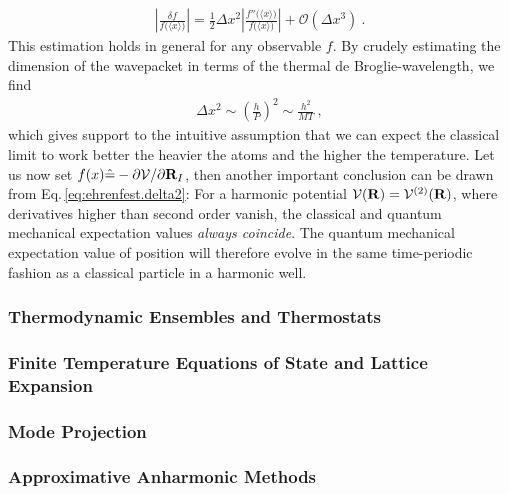 \begin{align}
  \left\lvert \frac{\delta f}{f \bm ( \langle x \rangle \bm{)}} \right\rvert
  = \frac{1}{2} \Delta x^2 \left\lvert \frac{f'' \bm ( \langle x \rangle \bm{)}}{f \bm ( \langle x \rangle \bm{)}} \right\rvert
+ \mathcal{O}(\Delta x^3)~.
  \label{eq:ehrenfest.delta2}
\end{align}
This estimation holds in general for any observable $f$.
By crudely estimating the dimension of the wavepacket in terms of the thermal de Broglie-wavelength, we find
\begin{align}
  \Delta x^2 
    \sim \left( \frac{h}{P} \right)^2
    \sim \frac{h^2}{MT}~,
  \label{eq:ehrenfest:dimension}
\end{align}
which gives support to the intuitive assumption that we can expect the classical limit to work better the heavier the atoms and the higher the temperature.
Let us now set $f(x) \hat = -\partial \mathcal V / \partial {\bf R}_I$, then another important conclusion can be drawn from Eq.\,\eqref{eq:ehrenfest.delta2}: For a harmonic potential $\mathcal V ({\bf R}) = \mathcal V^{(2)} ({\bf R})$, where derivatives higher than second order vanish, the classical and quantum mechanical expectation values \emph{always coincide}. The quantum mechanical expectation value of position will therefore evolve in the same time-periodic fashion as a classical particle in a harmonic well.


\subsubsection{Thermodynamic Ensembles and Thermostats}
\subsubsection{Finite Temperature Equations of State and Lattice Expansion}
\subsubsection{Mode Projection}
\subsubsection{Approximative Anharmonic Methods}

